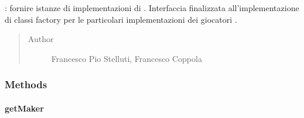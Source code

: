 \documentclass[letterpaper,10pt,italian,openany,oneside]{sphinxmanual}
\begin{document}
\begin{fulllineitems}
\label{\detokenize{source/it/unicam/cs/pa/mastermind/factories/MakerFactory:it.unicam.cs.pa.mastermind.factories.MakerFactory}}
: fornire istanze di implementazioni di . Interfaccia finalizzata all’implementazione di classi factory per le particolari implementazioni dei giocatori .
\begin{quote}\begin{description}
\item[{Author}] \leavevmode
Francesco Pio Stelluti, Francesco Coppola

\end{description}\end{quote}

\end{fulllineitems}



\subsubsection{Methods}
\label{\detokenize{source/it/unicam/cs/pa/mastermind/factories/MakerFactory:methods}}

\paragraph{getMaker}
\label{\detokenize{source/it/unicam/cs/pa/mastermind/factories/MakerFactory:getmaker}}
\end{document}
